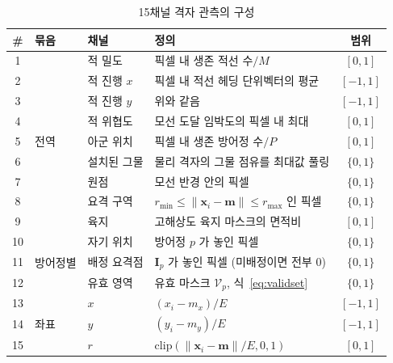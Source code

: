 \begin{table}[!tp]
\centering
\caption{15채널 격자 관측의 구성}
\label{tab:channels}
\footnotesize
\renewcommand{\arraystretch}{1.15}
\begin{tabular}{@{}clllc@{}}
\toprule
\# & 묶음 & 채널 & 정의 & 범위 \\
\midrule
1  & \multirow{9}{*}{전역}   & 적 밀도        & 픽셀 내 생존 적선 수$/M$                                & $[0,1]$ \\
2  &                         & 적 진행 $x$    & 픽셀 내 적선 헤딩 단위벡터의 평균                      & $[-1,1]$ \\
3  &                         & 적 진행 $y$    & 위와 같음                                              & $[-1,1]$ \\
4  &                         & 적 위협도      & 모선 도달 임박도의 픽셀 내 최대                        & $[0,1]$ \\
5  &                         & 아군 위치      & 픽셀 내 생존 방어정 수$/P$                             & $[0,1]$ \\
6  &                         & 설치된 그물    & 물리 격자의 그물 점유를 최대값 풀링                     & $\{0,1\}$ \\
7  &                         & 원점           & 모선 반경 안의 픽셀                                    & $\{0,1\}$ \\
8  &                         & 요격 구역      & $r_{\min} \le \lVert \mathbf{x}_i - \mathbf{m} \rVert \le r_{\max}$ 인 픽셀 & $\{0,1\}$ \\
9  &                         & 육지           & 고해상도 육지 마스크의 면적비  & $[0,1]$ \\
\midrule
10 & \multirow{3}{*}{방어정별} & 자기 위치     & 방어정 $p$ 가 놓인 픽셀                                & $\{0,1\}$ \\
11 &                         & 배정 요격점    & $\mathbf{I}_p$ 가 놓인 픽셀 (미배정이면 전부 0)        & $\{0,1\}$ \\
12 &                         & 유효 영역      & 유효 마스크 $\mathcal{V}_p$, 식~\eqref{eq:validset}    & $\{0,1\}$ \\
\midrule
13 & \multirow{3}{*}{좌표}   & $x$            & $(x_i - m_x)/E$                                        & $[-1,1]$ \\
14 &                         & $y$            & $(y_i - m_y)/E$                                        & $[-1,1]$ \\
15 &                         & $r$            & $\mathrm{clip}(\lVert \mathbf{x}_i - \mathbf{m} \rVert / E, 0, 1)$ & $[0,1]$ \\
\bottomrule
\end{tabular}
\end{table}

